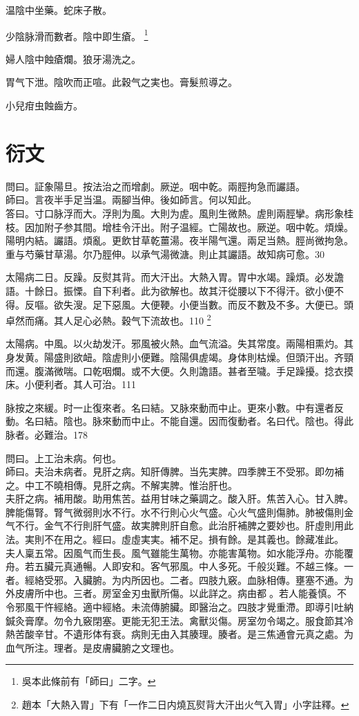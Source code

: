 温陰中坐藥。蛇床子散。

少陰脉滑而數者。陰中即生瘡。
	\footnote{
		吳本此條前有「師曰」二字。
	}

婦人陰中蝕瘡爛。狼牙湯洗之。

胃气下泄。陰吹而正喧。此穀气之実也。膏髮煎導之。

小兒疳虫蝕齒方。


\part{衍文}

問曰。証象陽旦。按法治之而增劇。厥逆。咽中乾。兩脛拘急而讝語。\\
師曰。言夜半手足当温。兩腳当伸。後如師言。何以知此。\\
答曰。寸口脉浮而大。浮{\khaai 則}为風。大{\khaai 則}为虗。風則生微熱。虗則兩脛攣。病形象桂枝。因加附子参其間。增桂令汗出。附子温經。亡陽故也。厥逆。咽中乾。煩燥。陽明内結。讝語。煩亂。更飲甘草乾薑湯。夜半陽气還。兩足当熱。脛尚微拘急。重与芍藥甘草湯。尔乃脛伸。以承气湯微溏。則止其讝語。故知病可愈。30

太陽病二日。反躁。反熨其背。而大汗出。大熱入胃。胃中水竭。躁煩。必发譫語。十餘日。振慄。自下利者。此为欲解也。故其汗從腰以下不得汗。欲小便不得。反嘔。欲失溲。足下惡風。大便鞕。小便当數。而反不數及不多。大便已。頭卓然而痛。其人足心必熱。穀气下流故也。110
	\footnote{
		趙本「大熱入胃」下有「一作二日内燒瓦熨背大汗出火气入胃」小字註釋。
	}

太陽病。中風。以火劫发汗。邪風被火熱。血气流溢。失其常度。兩陽相熏灼。其身发黄。陽盛則欲衄。陰虗{\khaai 則}小便難。陰陽俱虗竭。身体則枯燥。但頭汗出。齐頸而還。腹滿微喘。口乾咽爛。或不大便。久則譫語。甚者至噦。手足躁擾。捻衣摸床。小便利者。其人可治。111

脉按之來緩。时一止復來者。名曰結。又脉來動而中止。更來小數。中有還者反動。名曰結。陰也。脉來動而中止。不能自還。因而復動者。名曰代。陰也。得此脉者。必難治。178

問曰。上工治未病。何也。\\
師曰。夫治未病者。見肝之病。知肝傳脾。当先実脾。四季脾王不受邪。即勿補之。中工不曉相傳。見肝之病。不解実脾。惟治肝也。\\
夫肝之病。補用酸。助用焦苦。益用甘味之藥調之。酸入肝。焦苦入心。甘入脾。脾能傷腎。腎气微弱則水不行。水不行則心火气盛。心火气盛則傷肺。肺被傷則金气不行。金气不行則肝气盛。故実脾則肝自愈。此治肝補脾之要妙也。肝虛則用此法。実則不在用之。經曰。虛虛実実。補不足。損有餘。是其義也。餘藏准此。\\
夫人稟五常。因風气而生長。風气雖能生萬物。亦能害萬物。如水能浮舟。亦能覆舟。若五臟元真通暢。人即安和。客气邪風。中人多死。千般災難。不越三條。一者。經絡受邪。入臟腑。为内所因也。二者。四肢九竅。血脉相傳。壅塞不通。为外皮膚所中也。三者。房室金刃虫獸所傷。以此詳之。病由都{\sungii 𥁞}。若人能養慎。不令邪風干忤經絡。適中經絡。未流傳腑臟。即醫治之。四肢才覺重滯。即導引吐納鍼灸膏摩。勿令九竅閉塞。更能无犯王法。禽獸災傷。房室勿令竭之。服食節其冷熱苦酸辛甘。不遺形体有衰。病則无由入其腠理。腠者。是三焦通會元真之處。为血气所注。理者。是皮膚臟腑之文理也。

